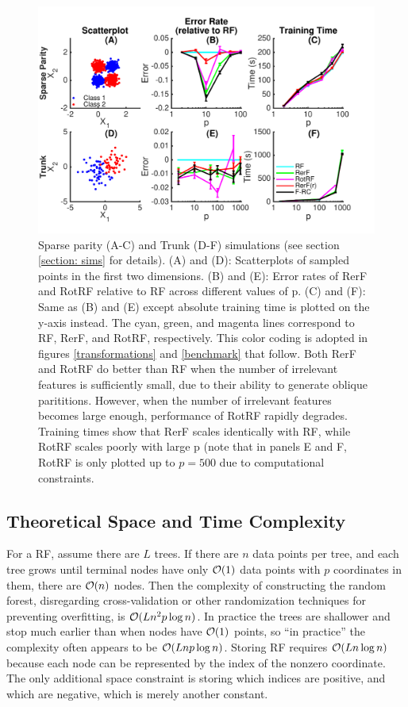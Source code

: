 \documentclass[10pt]{article}
\begin{document}
\begin{figure}[ht]
\vskip 0.2in
\begin{center}
\centerline{\includegraphics[width=\columnwidth]{../../Figures/pdf/Fig2_simulations}}
\caption{Sparse parity (A-C) and Trunk (D-F) simulations (see section \ref{section: sims} for details). (A) and (D): Scatterplots of sampled points in the first two dimensions. (B) and (E): Error rates of RerF and RotRF relative to RF across different values of p. (C) and (F): Same as (B) and (E) except absolute training time is plotted on the y-axis instead. The cyan, green, and magenta lines correspond to RF, RerF, and RotRF, respectively. This color coding is adopted in figures \ref{transformations} and \ref{benchmark} that follow. Both RerF and RotRF do better than RF when the number of irrelevant features is sufficiently small, due to their ability to generate oblique parititions. However, when the number of irrelevant features becomes large enough, performance of RotRF rapidly degrades. Training times show that RerF scales identically with RF, while RotRF scales poorly with large p (note that in panels E and F, RotRF is only plotted up to $p = 500$ due to computational constraints.}
\label{simulations}
\end{center}
\vskip -0.2in
\end{figure}

\subsection{Theoretical Space and Time Complexity}

For a RF, assume there are $L$ trees.  
If there are $n$ data points per tree, and each tree grows until terminal nodes have only $\mathcal{O}(1)$ data points with $p$ coordinates in them, there are $\mathcal{O}(n)$ nodes.
Then the complexity of constructing the random forest, disregarding cross-validation or other randomization techniques for preventing overfitting, is $\mathcal{O}(Ln^2p\log n)$. In practice the trees are shallower and stop much earlier than when nodes have $\mathcal{O}(1)$ points, so ``in practice'' the complexity often appears to be $\mathcal{O}(Lnp\log n)$. Storing RF requires $\mathcal{O}(L n\log n )$ because each node can be represented by the index of the nonzero coordinate. The only additional space constraint is storing which indices are positive, and which are negative, which is merely another constant.
\end{document}

